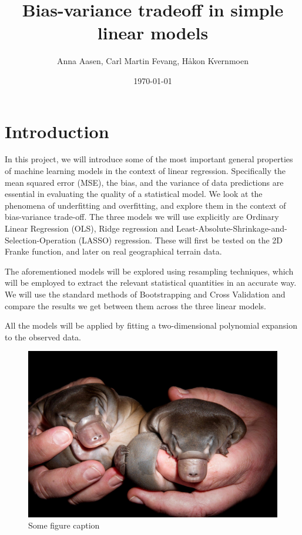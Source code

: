 \documentclass[twocolumn,english,notitlepage]{article}
\title{Bias-variance tradeoff in simple linear models} %
\author{Anna Aasen, Carl Martin Fevang, Håkon Kvernmoen}
\date{\today}
\begin{document}

\section{Introduction}
    In this project, we will introduce some of the most important general properties of machine learning models in the context of linear regression. Specifically the mean squared error (MSE), the bias, and the variance of data predictions are essential in evaluating the quality of a statistical model. We look at the phenomena of underfitting and overfitting, and explore them in the context of bias-variance trade-off. The three models we will use explicitly are Ordinary Linear Regression (OLS), Ridge regression and Least-Absolute-Shrinkage-and-Selection-Operation (LASSO) regression. These will first be tested on the 2D Franke function, and later on real geographical terrain data.

    The aforementioned models will be explored using resampling techniques, which will be employed to extract the relevant statistical quantities in an accurate way. We will use the standard methods of Bootstrapping and Cross Validation and compare the results we get between them across the three linear models.

    All the models will be applied by fitting a two-dimensional polynomial expansion to the observed data.



\begin{figure}[H]\label{fig:intro:plat}
    \centering
    \includegraphics[width=0.5\linewidth]{Young-Platypus.jpg}
    \caption{Some figure caption}
\end{figure}
\end{document}
